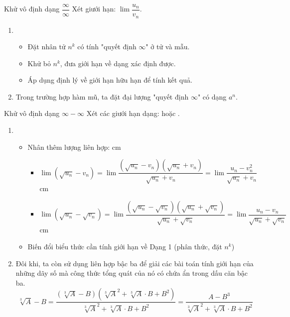\begin{dang}{Khử vô định dạng $\dfrac{\infty}{\infty}$}
	Xét giưới hạn: $\lim\dfrac{u_n}{v_n}$.
	\begin{enumerate}[\iconMT]
		\item {}
		\begin{itemize}
			\item Đặt nhân tử $n^k$ có tính "quyết định $\infty$" ở tử và mẫu.
			\item Khử bỏ $n^k$, đưa giới hạn về dạng xác định được.
			\item Áp dụng định lý về giới hạn hữu hạn để tính kết quả.
		\end{itemize}
		\item {} Trong trường hợp hàm mũ, ta đặt đại lượng "quyết định $\infty$" có dạng $a^n$.
	\end{enumerate}
\end{dang}

\begin{dang}{Khử vô định dạng $\infty -\infty $}
	Xét các giưới hạn dạng:  hoặc .
	\begin{enumerate}[\iconMT]
		\item {}
		\begin{itemize}
			\item Nhân thêm lượng liên hợp:
			 cm
			\begin{itemize}
				\item [\ding{172}]$\lim\left( \sqrt{u_n}-v_n\right)=\lim \dfrac{\left(\sqrt{u_n}-v_n\right)\left( \sqrt{u_n}+v_n\right)}{\sqrt{u_n}+v_n}=\lim \dfrac{u_n-v_n^2}{\sqrt{u_n}+v_n}$
				 cm
				\item [\ding{173}] $\lim\left( \sqrt{u_n}-\sqrt{v_n}\right)=\lim \dfrac{\left(\sqrt{u_n}-\sqrt{v_n}\right)\left( \sqrt{u_n}+\sqrt{v_n}\right)}{\sqrt{u_n}+\sqrt{v_n}}=\lim \dfrac{u_n-v_n}{\sqrt{u_n}+\sqrt{v_n}}$
				 cm
			\end{itemize} 
			\item Biến đổi biểu thức cần tính giới hạn về Dạng 1 (phân thức, đặt $n^k$) 
		\end{itemize}
		\item {} Đôi khi, ta còn sử dụng liên hợp bậc ba để giải các bài toán tính giới hạn của những dãy số mà công thức tổng quát của nó có chứa ẩn trong dấu căn bậc ba. 
		$$\sqrt[3]{A}-B=\dfrac{\left( \sqrt[3]{A}-B\right) \left(\sqrt[3]{A}^2+\sqrt[3]{A}\cdot B + B^2 \right) }{\sqrt[3]{A}^2+\sqrt[3]{A}\cdot B + B^2}=\dfrac{A-B^3}{\sqrt[3]{A}^2+\sqrt[3]{A}\cdot B + B^2}$$
	\end{enumerate}
\end{dang}

